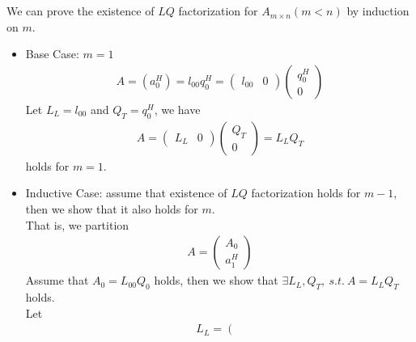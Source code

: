 \documentclass[11pt,a4paper]{article}
\begin{document}
\section{}
We can prove the existence of $LQ$ factorization for $A_{m\times n} (m < n)$ by induction on $m$.
\begin{itemize}
    \item Base Case: $m = 1$
        \begin{align}
            A = (a_0^H) = l_{00} q_0^H =
            \left( \begin{array}{c|c}
                    l_{00} & 0
                \end{array} \right)
            \left( \begin{array}{c}
                    q_0^H \\
                    \hline
                    0
                \end{array} \right)
        \end{align}
        Let $L_L = l_{00}$ and $Q_T = q_0^H$, we have 
        \begin{align}
            A = 
            \left( \begin{array}{c|c}
                   L_L & 0
                \end{array} \right)
            \left( \begin{array}{c}
                    Q_T \\
                    \hline
                    0
                \end{array} \right)
            = L_L Q_T
        \end{align}
        holds for $m = 1$.
    \item Inductive Case: assume that existence of $LQ$ factorization holds
        for $m-1$, then we show that it also holds for $m$. \\
        That is, we partition 
        \begin{align}
            A = \left( \begin{array}{c}
                   A_0 \\ \hline a_1^H
                \end{array} \right)
        \end{align} 
        Assume that $A_0 = L_{00} Q_0$ holds, then we show that 
        $\exists L_L, Q_T,\ s.t.\ A = L_L Q_T$ holds. \\
        Let 
            \begin{align}
                L_L = 
                \left( \begin{array}{c|c}

\end{array}
\end{align}
\end{itemize}
\end{document}
